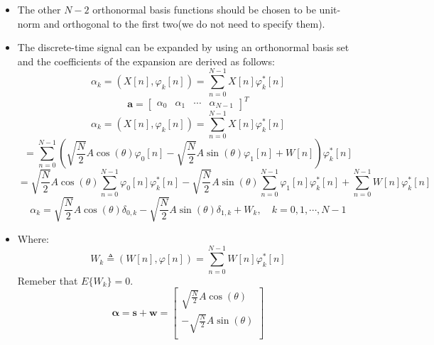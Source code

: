 \begin{itemize}
   \[
(\varphi_0, \varphi_0) = \sum_{n=0}^{N-1} \sqrt{\frac{2}{N}}\cos(2\pi F_0 n) \sqrt{\frac{2}{N}}\cos(2\pi F_0 n)
= \frac{2}{N} \sum_{n=0}^{N-1} \cos^2(2\pi F_0 n)
\]
\[
= \frac{2}{N} \sum_{n=0}^{N-1} \left( \frac{1}{2} + \frac{1}{2}\cos(4\pi F_0 n) \right)
= 1 + \frac{1}{N} \sum_{n=0}^{N-1} \cos(4\pi F_0 n) \cong 1 \quad (\text{for } N \text{ very large})
\]
\[
(\varphi_1, \varphi_1) = \sum_{n=0}^{N-1} \sqrt{\frac{2}{N}}\sin(2\pi F_0 n) \sqrt{\frac{2}{N}}\sin(2\pi F_0 n)
= \frac{2}{N} \sum_{n=0}^{N-1} \sin^2(2\pi F_0 n)
\]
\[
= \frac{2}{N} \sum_{n=0}^{N-1} \left( \frac{1}{2} - \frac{1}{2}\cos(4\pi F_0 n) \right)
= 1 - \frac{1}{N} \sum_{n=0}^{N-1} \cos(4\pi F_0 n) \cong 1
\]
\[
(\varphi_0, \varphi_1) = \sum_{n=0}^{N-1} \sqrt{\frac{2}{N}}\cos(2\pi F_0 n) \sqrt{\frac{2}{N}}\sin(2\pi F_0 n)
= \frac{2}{N} \sum_{n=0}^{N-1} \frac{1}{2}\sin(4\pi F_0 n)
= \frac{1}{N} \sum_{n=0}^{N-1} \sin(4\pi F_0 n) \cong 0
\]
\item The other \(N-2\) orthonormal basis functions should be chosen to be unit-norm and orthogonal to the first two(we do not need to specify them).
\item The discrete-time signal can be expanded by using an orthonormal basis set and the coefficients of the expansion are derived as follows:
\[
    \alpha_k = \left( X[n], \varphi_k[n] \right ) = \sum_{n=0}^{N-1} X[n] \varphi_k^*[n] 
\]
\[ 
    \mathbf{a} = \begin{bmatrix} \alpha_0& \alpha_1 &\cdots & \alpha_{N-1}
\end{bmatrix}^T     
\]
\[
    \alpha_k = \left( X[n], \varphi_k[n] \right ) = \sum_{n=0}^{N-1} X[n] \varphi_k^*[n]
\]
\[
    = \sum_{n=0}^{N-1} \left( \sqrt{\frac{N}{2}} A \cos(\theta) \varphi_0[n] 
        - \sqrt{\frac{N}{2}} A \sin(\theta) \varphi_1[n]
        + W[n] \right) \varphi_k^*[n] \]
\[
    = \sqrt{\frac{N}{2}} A \cos(\theta) \sum_{n=0}^{N-1} \varphi_0[n] \varphi_k^*[n]
        - \sqrt{\frac{N}{2}} A \sin(\theta) \sum_{n=0}^{N-1} \varphi_1[n] \varphi_k^*[n]
        + \sum_{n=0}^{N-1} W[n] \varphi_k^*[n]
\]
\[
\alpha_k = \sqrt{\frac{N}{2}} A\cos(\theta)\delta_{0,k}
    - \sqrt{\frac{N}{2}} A\sin(\theta)\delta_{1,k}
    + W_k,\quad k = 0, 1, \cdots, N-1
\]
\item Where: \[W_k\triangleq(W[n],\varphi[n])=\sum_{n=0}^{N-1}W[n]\varphi_k^*[n]\]
Remeber that \(E\{W_k\}=0\).
\[
\mathbf{\alpha} = \mathbf{s} + \mathbf{w} =
\begin{bmatrix}
    \sqrt{\frac{N}{2}} A\cos(\theta) \\
    -\sqrt{\frac{N}{2}} A\sin(\theta) \\

\end{bmatrix}\]
\end{itemize}
